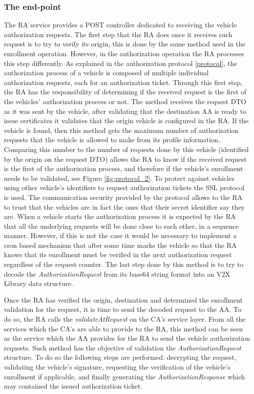 \subsubsection{The end-point}
The RA service provides a POST controller dedicated to receiving the vehicle authorization requests. The first step that the RA does once it receives such request is to try to verify its origin, this is done by the same   method used in the enrollment operation. However, in the authorization operation the RA processes this step differently. As explained in the authorization protocol \ref{protocol}, the authorization process of a vehicle is composed of multiple individual authorization requests, each for an authorization ticket. Through this first step, the RA has the responsibility of determining if the received request is the first of the vehicles' authorization process or not. The  method receives the request DTO as it was sent by the vehicle, after validating that the destination AA is ready to issue certificates it validates that the origin vehicle is configured in the RA. If the vehicle is found, then this method gets the maximum number of authorization requests that the vehicle is allowed to make from its profile information. Comparing this number to the number of requests done by this vehicle (identified by the origin on the request DTO) allows the RA to know if the received request is the first of the authorization process, and therefore if the vehicle's enrollment needs to be validated, see Figure \ref{fig:protocol_2}. To protect against vehicles using other vehicle's identifiers to request authorization tickets the SSL protocol is used. The communication security provided by the protocol allows to the RA to trust that the vehicles are in fact the ones that their secret identifier say they are. When a vehicle starts the authorization process it is expected by the RA that all the underlying requests will be done close to each other, in a sequence manner. However, if this is not the case it would be necessary to implement a cron based mechanism that after some time marks the vehicle so that the RA knows that its enrollment must be verified in the next authorization request regardless of the request counter. The last step done by this method is to try to decode the \textit{AuthorizationRequest} from its base64 string format into an V2X Library data structure. 


Once the RA has verified the origin, destination and determined the enrollment validation for the request, it is time to send the decoded request to the AA. To do so, the RA calls the \textit{validateAtRequest} on the CA's service layer. From all the services which the CA's are able to provide to the RA, this method can be seen as the service which the AA provides for the RA to send the vehicle authorization requests. Such method has the objective of validation the \textit{AuthorizationRequest} structure. To do so the following steps are performed: decrypting the request, validating the vehicle's signature, requesting the verification of the vehicle's enrollment if applicable, and finally generating the \textit{AuthorizationResponse} which may contained the issued authorization ticket.


